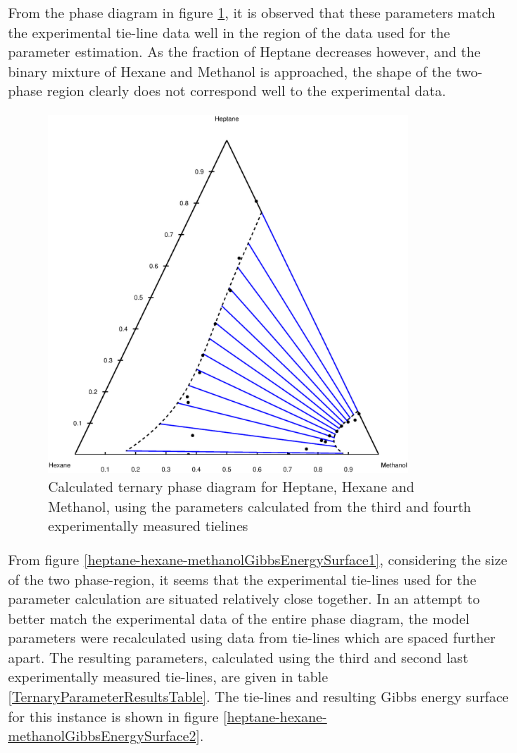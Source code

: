 From the phase diagram in figure \ref{heptane-hexane-methanolFigure1}, it is observed that these parameters match the experimental tie-line data well in the region of the data used for the parameter estimation. As the fraction of Heptane decreases however, and the binary mixture of Hexane and Methanol is approached, the shape of the two-phase region clearly does not correspond well to the experimental data.\\

\begin{figure}[h]
\centering
\includegraphics[width = 0.85\textwidth]{Results_Parts/TernaryParams/heptane-hexane-methanol/DWPMTieline3and4/CalculatedPhaseDiagram.eps}
\caption{Calculated ternary phase diagram for Heptane, Hexane and Methanol, using the parameters calculated from the third and fourth experimentally measured tielines} \label{heptane-hexane-methanolFigure1}
\end{figure}	
\clearpage

From figure \ref{heptane-hexane-methanolGibbsEnergySurface1}, considering the size of the two phase-region, it seems that the experimental tie-lines used for the parameter calculation are situated relatively close together. In an attempt to better match the experimental data of the entire phase diagram, the model parameters were recalculated using data from tie-lines which are spaced further apart. The resulting parameters, calculated using the third and second last experimentally measured tie-lines, are given in table \ref{TernaryParameterResultsTable}. The tie-lines and resulting Gibbs energy surface for this instance is shown in figure \ref{heptane-hexane-methanolGibbsEnergySurface2}.\\

